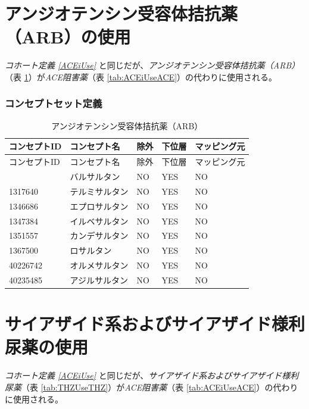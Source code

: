 \documentclass[
  11pt]{book}
\theoremstyle{definition}
\theoremstyle{definition}
\theoremstyle{definition}
\theoremstyle{definition}
\theoremstyle{remark}
\begin{document}
\section{アンジオテンシン受容体拮抗薬（ARB）の使用}\label{ARBUse}

\emph{コホート定義 \ref{ACEiUse}} と同じだが、\emph{アンジオテンシン受容体拮抗薬（ARB）}（表 \ref{tab:ARBUseARBs}）が\emph{ACE阻害薬}（表 \ref{tab:ACEiUseACE}）の代わりに使用される。

\subsubsection*{コンセプトセット定義}\label{ux30b3ux30f3ux30bbux30d7ux30c8ux30bbux30c3ux30c8ux5b9aux7fa9-5}

\begin{longtable}[]{@{}lllll@{}}
\caption{\label{tab:ARBUseARBs} アンジオテンシン受容体拮抗薬（ARB）}\tabularnewline
\toprule\noalign{}
コンセプトID & コンセプト名 & 除外 & 下位層 & マッピング元 \\
\midrule\noalign{}
\endfirsthead
\toprule\noalign{}
コンセプトID & コンセプト名 & 除外 & 下位層 & マッピング元 \\
\midrule\noalign{}
\endhead
\bottomrule\noalign{}
\endlastfoot
1308842 & バルサルタン & NO & YES & NO \\
1317640 & テルミサルタン & NO & YES & NO \\
1346686 & エプロサルタン & NO & YES & NO \\
1347384 & イルベサルタン & NO & YES & NO \\
1351557 & カンデサルタン & NO & YES & NO \\
1367500 & ロサルタン & NO & YES & NO \\
40226742 & オルメサルタン & NO & YES & NO \\
40235485 & アジルサルタン & NO & YES & NO \\
\end{longtable}

\section{サイアザイド系およびサイアザイド様利尿薬の使用}\label{THZUse}

\emph{コホート定義 \ref{ACEiUse}} と同じだが、\emph{サイアザイド系およびサイアザイド様利尿薬}（表 \ref{tab:THZUseTHZ}）が\emph{ACE阻害薬}（表 \ref{tab:ACEiUseACE}）の代わりに使用される。
\end{document}
